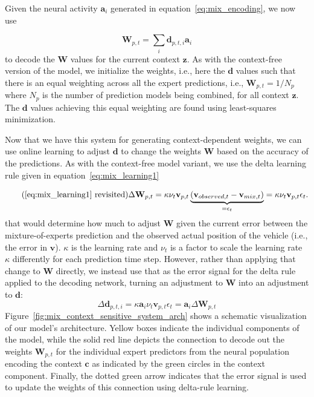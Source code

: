 Given the neural activity $\mathbf{a}_i$ generated in equation~\eqref{eq:mix_encoding}, we now use 

\begin{equation}
  \mathbf{W}_{p,t} = \sum_{i} \mathbf{d}_{p,t,i}\mathbf{a}_i
  \label{eq:mix_decoding}
\end{equation}
to decode the $\mathbf{W}$ values for the current context $\mathbf{z}$. 
As with the context-free version of the model, we initialize the weights, i.e., here the $\mathbf{d}$ values such that there is an equal weighting across all the expert predictions, i.e., $\mathbf{W}_{p,t} = 1/N_p$ where $N_p$ is the number of prediction models being combined, for all context $\mathbf{z}$.
The $\mathbf{d}$ values achieving this equal weighting are found using least-squares minimization.

Now that we have this system for generating context-dependent weights, we can use online learning to adjust $\mathbf{d}$ to change the weights $\mathbf{W}$ based on the accuracy of the predictions. 
As with the context-free model variant, we use the delta learning rule given in equation~\eqref{eq:mix_learning1}  

\begin{equation}
    \tag{\eqref{eq:mix_learning1} revisited}
    \Delta\mathbf{W}_{p,t} = \kappa \nu_{t} \mathbf{v}_{p,t} \underbrace{(\mathbf{v}_{observed,t}-\mathbf{v}_{mix,t})}_{=\epsilon_t} = \kappa \nu_{t} \mathbf{v}_{p,t} \epsilon_t.
\end{equation}
that would determine how much to adjust $\mathbf{W}$ given the current error between the mixture-of-experts prediction and the observed actual position of the vehicle (i.e., the error in $\mathbf{v}$).  
$\kappa$ is the learning rate and $\nu_{t}$ is a factor to scale the learning rate $\kappa$ differently for each prediction time step.
However, rather than applying that change to $\mathbf{W}$ directly, we instead use that as the error signal for the delta rule applied to the decoding network, turning an adjustment to $\mathbf{W}$ into an adjustment to $\mathbf{d}$:
\begin{equation}
\Delta\mathbf{d}_{p,t,i} = \kappa \mathbf{a}_i \nu_{t} \mathbf{v}_{p,t} \epsilon_t = \mathbf{a}_i \Delta\mathbf{W}_{p,t}
  \label{eq:learning2}
\end{equation}
Figure~\ref{fig:mix_context_sensitive_system_arch} shows a schematic visualization of our model's architecture.
Yellow boxes indicate the individual components of the model, while the solid red line depicts the connection to decode out the weights $ \mathbf{W}_{p,t}$ for the individual expert predictors from the neural population encoding the context $\mathbf{c}$ as indicated by the green circles in the context component.
Finally, the dotted green arrow indicates that the error signal is used to update the weights of this connection using delta-rule learning.

